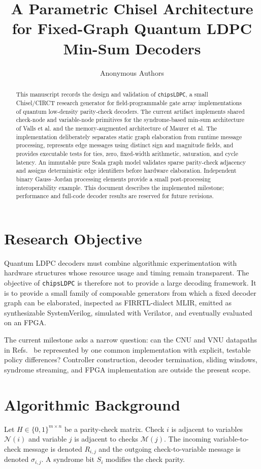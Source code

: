 \documentclass[10pt,conference]{IEEEtran}
\title{A Parametric Chisel Architecture for Fixed-Graph Quantum LDPC Min-Sum Decoders}
\author{Anonymous Authors}
\begin{document}
\maketitle

\begin{abstract}
This manuscript records the design and validation of \texttt{chipsLDPC}, a
small Chisel/CIRCT research generator for field-programmable gate array
implementations of quantum low-density parity-check decoders.  The current
artifact implements shared check-node and variable-node primitives for the
syndrome-based min-sum architecture of Valls et al. and the memory-augmented
architecture of Maurer et al.  The implementation deliberately separates
static graph elaboration from runtime message processing, represents edge
messages using distinct sign and magnitude fields, and provides executable
tests for ties, zero, fixed-width arithmetic, saturation, and cycle latency.
An immutable pure Scala graph model validates sparse parity-check adjacency and
assigns deterministic edge identifiers before hardware elaboration.
Independent binary Gauss--Jordan processing elements provide a small
post-processing interoperability example.
This document describes the implemented milestone; performance and full-code
decoder results are reserved for future revisions.
\end{abstract}

\section{Research Objective}
Quantum LDPC decoders must combine algorithmic experimentation with hardware
structures whose resource usage and timing remain transparent.  The objective
of \texttt{chipsLDPC} is therefore not to provide a large decoding framework.
It is to provide a small family of composable generators from which a fixed
decoder graph can be elaborated, inspected as FIRRTL-dialect MLIR, emitted as
synthesizable SystemVerilog, simulated with Verilator, and eventually evaluated
on an FPGA.

The current milestone asks a narrow question: can the CNU and VNU datapaths in
Refs.~\cite{valls2021,maurer2025} be represented by one common implementation
with explicit, testable policy differences?  Controller construction, decoder
termination, sliding windows, syndrome streaming, and FPGA implementation are
outside the present scope.

\section{Algorithmic Background}
Let $H\in\{0,1\}^{m\times n}$ be a parity-check matrix.  Check $i$ is adjacent
to variables $\mathcal{N}(i)$ and variable $j$ is adjacent to checks
$\mathcal{M}(j)$.  The incoming variable-to-check message is denoted
$R_{i,j}$ and the outgoing check-to-variable message is denoted
$\sigma_{i,j}$.  A syndrome bit $S_i$ modifies the check parity.
\end{document}
